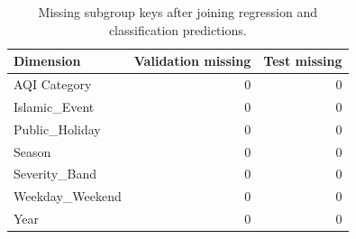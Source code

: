 \begin{table}[htbp]
\centering
\small
\caption{Missing subgroup keys after joining regression and classification predictions.}
\label{tab:bias-missing}
\begin{tabular}{lrr}
\toprule
Dimension & Validation missing & Test missing \\
\midrule
AQI Category & 0 & 0 \\
Islamic\_Event & 0 & 0 \\
Public\_Holiday & 0 & 0 \\
Season & 0 & 0 \\
Severity\_Band & 0 & 0 \\
Weekday\_Weekend & 0 & 0 \\
Year & 0 & 0 \\
\bottomrule
\end{tabular}

\end{table}
